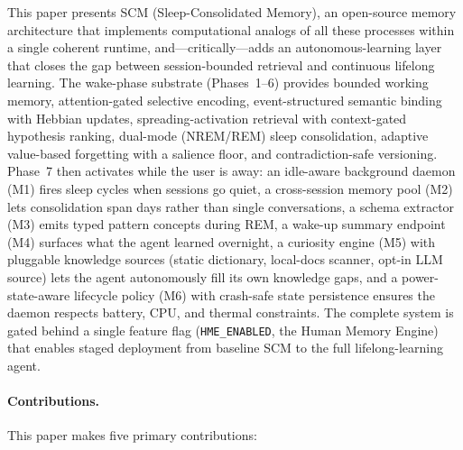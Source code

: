 \documentclass[11pt,twocolumn]{article}
\begin{document}
This paper presents SCM (Sleep-Consolidated Memory), an open-source memory architecture that implements computational analogs of all these processes within a single coherent runtime, and---critically---adds an autonomous-learning layer that closes the gap between session-bounded retrieval and continuous lifelong learning. The wake-phase substrate (Phases~1--6) provides bounded working memory, attention-gated selective encoding, event-structured semantic binding with Hebbian updates, spreading-activation retrieval with context-gated hypothesis ranking, dual-mode (NREM/REM) sleep consolidation, adaptive value-based forgetting with a salience floor, and contradiction-safe versioning. Phase~7 then activates while the user is away: an idle-aware background daemon (M1) fires sleep cycles when sessions go quiet, a cross-session memory pool (M2) lets consolidation span days rather than single conversations, a schema extractor (M3) emits typed pattern concepts during REM, a wake-up summary endpoint (M4) surfaces what the agent learned overnight, a curiosity engine (M5) with pluggable knowledge sources (static dictionary, local-docs scanner, opt-in LLM source) lets the agent autonomously fill its own knowledge gaps, and a power-state-aware lifecycle policy (M6) with crash-safe state persistence ensures the daemon respects battery, CPU, and thermal constraints. The complete system is gated behind a single feature flag (\texttt{HME\_ENABLED}, the Human Memory Engine) that enables staged deployment from baseline SCM to the full lifelong-learning agent.

\paragraph{Contributions.} This paper makes five primary contributions:
\end{document}
